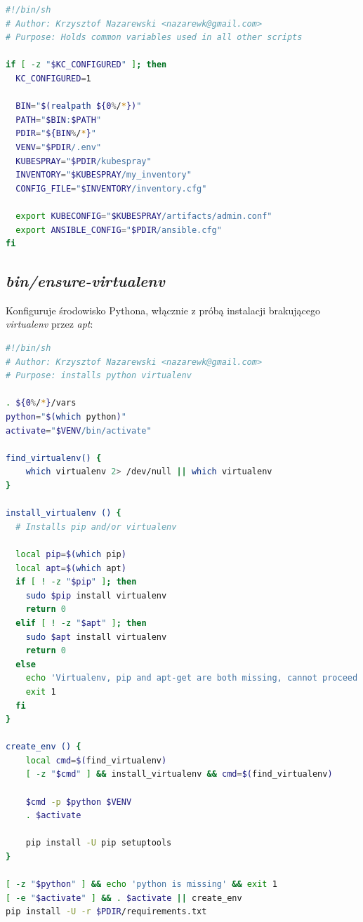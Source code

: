 \documentclass[a4paper,12pt,twoside,openany]{report}
\begin{document}
\begin{lstlisting}[language=bash]
#!/bin/sh
# Author: Krzysztof Nazarewski <nazarewk@gmail.com>
# Purpose: Holds common variables used in all other scripts

if [ -z "$KC_CONFIGURED" ]; then
  KC_CONFIGURED=1

  BIN="$(realpath ${0%/*})"
  PATH="$BIN:$PATH"
  PDIR="${BIN%/*}"
  VENV="$PDIR/.env"
  KUBESPRAY="$PDIR/kubespray"
  INVENTORY="$KUBESPRAY/my_inventory"
  CONFIG_FILE="$INVENTORY/inventory.cfg"

  export KUBECONFIG="$KUBESPRAY/artifacts/admin.conf"
  export ANSIBLE_CONFIG="$PDIR/ansible.cfg"
fi
\end{lstlisting}

\newpage

\hypertarget{binensure-virtualenv}{%
\subsection{\texorpdfstring{\emph{bin/ensure-virtualenv}}{bin/ensure-virtualenv}}\label{binensure-virtualenv}}

Konfiguruje środowisko Pythona, włącznie z próbą instalacji brakującego
\emph{virtualenv} przez \emph{apt}:

\begin{lstlisting}[language=bash]
#!/bin/sh
# Author: Krzysztof Nazarewski <nazarewk@gmail.com>
# Purpose: installs python virtualenv

. ${0%/*}/vars
python="$(which python)"
activate="$VENV/bin/activate"

find_virtualenv() {
    which virtualenv 2> /dev/null || which virtualenv
}

install_virtualenv () {
  # Installs pip and/or virtualenv

  local pip=$(which pip)
  local apt=$(which apt)
  if [ ! -z "$pip" ]; then
    sudo $pip install virtualenv
    return 0
  elif [ ! -z "$apt" ]; then
    sudo $apt install virtualenv
    return 0
  else
    echo 'Virtualenv, pip and apt-get are both missing, cannot proceed'
    exit 1
  fi
}

create_env () {
    local cmd=$(find_virtualenv)
    [ -z "$cmd" ] && install_virtualenv && cmd=$(find_virtualenv)

    $cmd -p $python $VENV
    . $activate

    pip install -U pip setuptools
}

[ -z "$python" ] && echo 'python is missing' && exit 1
[ -e "$activate" ] && . $activate || create_env
pip install -U -r $PDIR/requirements.txt
\end{lstlisting}
\end{document}

